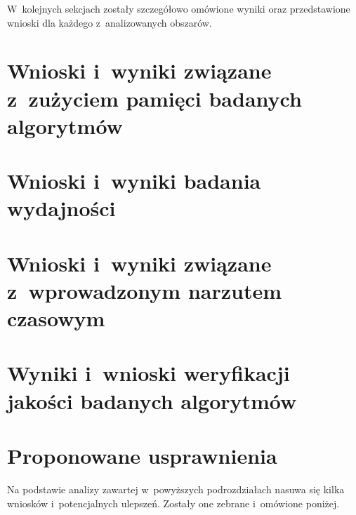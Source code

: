     W~kolejnych sekcjach zostały szczegółowo omówione wyniki oraz przedstawione wnioski dla każdego z~analizowanych obszarów.

  \section{Wnioski i~wyniki związane z~zużyciem pamięci badanych algorytmów}\label{Section_Memory}

  \section{Wnioski i~wyniki badania wydajności}\label{Section_Timing}

  \section{Wnioski i~wyniki związane z~wprowadzonym narzutem czasowym}\label{Section_Overhead}

  \section{Wyniki i~wnioski weryfikacji jakości badanych algorytmów}\label{Section_Quality}

  \section{Proponowane usprawnienia}\label{Section_Usprawnienia}

    Na podstawie analizy zawartej w~powyższych podrozdziałach nasuwa się kilka wniosków i~potencjalnych ulepszeń. Zostały one zebrane i~omówione poniżej.

